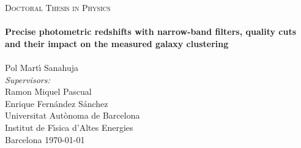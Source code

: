 \begin{titlepage}
\begin{center}

\textsc{\Large Doctoral Thesis in Physics}\\[1.5cm] %

\noindent\makebox[\linewidth]{\rule{\textwidth}{1pt}} \\[0.2cm]
{\huge \bfseries 
Precise photometric redshifts with narrow-band filters, quality cuts and their impact on the measured galaxy clustering}\\[0.2cm] %
\noindent\makebox[\linewidth]{\rule{\textwidth}{1pt}} \\[1.5cm]

\LARGE Pol Mart\'{\i} Sanahuja \\[2.0cm]

{\Large \emph{Supervisors:}\\ Ramon Miquel Pascual\\ Enrique Fern\'andez S\'anchez}\\[2cm]
 
{\Large Universitat Aut\`onoma de Barcelona}\\[0.2cm]
{\large Institut de F\'{\i}sica d'Altes Energies}\\[0.2cm] %
 
{\large Barcelona \today}\\[4cm] %
 
\vfill
\end{center}

\end{titlepage}

\clearpage{\pagestyle{empty}\cleardoublepage}
